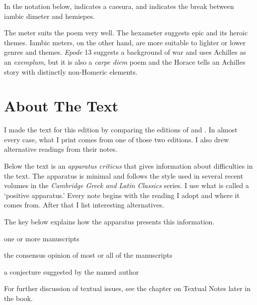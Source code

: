 In the notation below, \metra{\c} indicates a caesura, and \metra{\cc} indicates the break between iambic dimeter and hemiepes.\newline

\indent\metra{\m\mbb\m\mbb\m\c\mbb\m\mbb\m\mbb\m\mb}

\indent\indent\metra{\mb\m\b\m\mb\m\b\mb\cc\m\bb\m\bb\mb}\newline

The meter suits the poem very well.  The hexameter suggests epic and its heroic themes.  Iambic meters, on the other hand, are more suitable to lighter or lower genres and themes.  \textit{Epode} 13 suggests a background of war and uses Achilles as an \textit{exemplum}, but it is also a \textit{carpe diem} poem and the Horace tells an Achilles story with distinctly non-Homeric elements.


\section*{About The Text}

I made the text for this edition by comparing the editions of \citet{sb1985} and \citet{mankin1995}. In almost every case, what I print comes from one of those two editions. I also drew alternative readings from their notes.

Below the text is an \textit{apparatus criticus} that gives information about difficulties in the text.  The apparatus is minimal and follows the style used in several recent volumes in the \textit{Cambridge Greek and Latin Classics} series.  I use what is called a `positive apparatus.'  Every note begins with the reading I adopt and where it comes from.  After that I list interesting alternatives.

The key below explains how the apparatus presents this information.

\begin{description}%
    [style=sameline,leftmargin=70pt,labelwidth=\widthof{\textbf{Name}}]
    \item[m] one or more manuscripts
    \item[M] the consensus opinion of most or all of the manuscripts
    \item[Name] a conjecture suggested by the named author
\end{description}

For further discussion of textual issues, see the chapter on Textual Notes later in the book.

